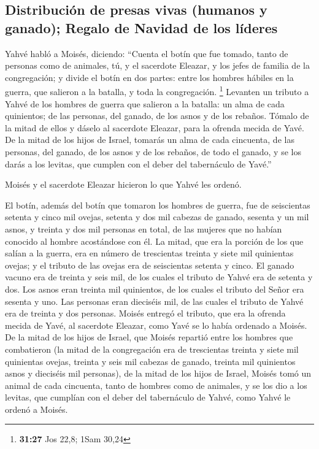\begin{paracol}{2}
\hypertarget{distribuciuxf3n-de-presas-vivas-humanos-y-ganado-regalo-de-navidad-de-los-luxedderes}{%
\subsection{Distribución de presas vivas (humanos y ganado); Regalo de
Navidad de los
líderes}\label{distribuciuxf3n-de-presas-vivas-humanos-y-ganado-regalo-de-navidad-de-los-luxedderes}}

 Yahvé habló a Moisés, diciendo:  ``Cuenta
el botín que fue tomado, tanto de personas como de animales, tú, y el
sacerdote Eleazar, y los jefes de familia de la congregación;
 y divide el botín en dos partes: entre los hombres
hábiles en la guerra, que salieron a la batalla, y toda la congregación.
\footnote{\textbf{31:27} Jos 22,8; 1Sam 30,24}  Levanten
un tributo a Yahvé de los hombres de guerra que salieron a la batalla:
un alma de cada quinientos; de las personas, del ganado, de los asnos y
de los rebaños.  Tómalo de la mitad de ellos y dáselo al
sacerdote Eleazar, para la ofrenda mecida de Yavé.  De la
mitad de los hijos de Israel, tomarás un alma de cada cincuenta, de las
personas, del ganado, de los asnos y de los rebaños, de todo el ganado,
y se los darás a los levitas, que cumplen con el deber del tabernáculo
de Yavé.''

 Moisés y el sacerdote Eleazar hicieron lo que Yahvé les
ordenó.

 El botín, además del botín que tomaron los hombres de
guerra, fue de seiscientas setenta y cinco mil ovejas, 
setenta y dos mil cabezas de ganado,  sesenta y un mil
asnos,  y treinta y dos mil personas en total, de las
mujeres que no habían conocido al hombre acostándose con él.
 La mitad, que era la porción de los que salían a la
guerra, era en número de trescientas treinta y siete mil quinientas
ovejas;  y el tributo de las ovejas era de seiscientas
setenta y cinco.  El ganado vacuno era de treinta y seis
mil, de los cuales el tributo de Yahvé era de setenta y dos.
 Los asnos eran treinta mil quinientos, de los cuales el
tributo del Señor era sesenta y uno.  Las personas eran
dieciséis mil, de las cuales el tributo de Yahvé era de treinta y dos
personas.  Moisés entregó el tributo, que era la ofrenda
mecida de Yavé, al sacerdote Eleazar, como Yavé se lo había ordenado a
Moisés.  De la mitad de los hijos de Israel, que Moisés
repartió entre los hombres que combatieron  (la mitad de
la congregación era de trescientas treinta y siete mil quinientas
ovejas,  treinta y seis mil cabezas de ganado,
 treinta mil quinientos asnos  y dieciséis
mil personas),  de la mitad de los hijos de Israel,
Moisés tomó un animal de cada cincuenta, tanto de hombres como de
animales, y se los dio a los levitas, que cumplían con el deber del
tabernáculo de Yahvé, como Yahvé le ordenó a Moisés.


\end{paracol}
